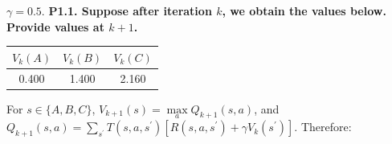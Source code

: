 \documentclass{homework}
\begin{document}
$\gamma = 0.5$.
\clearpage
\textbf{\large P1.1. Suppose after iteration $k$, we obtain the values below. Provide values at $k+1$.}

\begin{table}[h!]
    \centering
    \begin{tabular}{c|c|c}
        \toprule
        $V_k(A)$ & $V_k(B)$ & $V_k(C)$ \\
        \midrule
        0.400 & 1.400 & 2.160 \\
        \bottomrule
    \end{tabular}
    \label{tab:q1avk}
\end{table}
For $s \in \{ A, B, C \}$, $V_{k+1}(s) = \max\limits_{a} Q_{k+1}(s, a)$, and $Q_{k+1}(s, a) = \sum\limits_{s^{\prime}}{ T(s, a, s^{\prime})[ R(s, a, s^{\prime}) + \gamma V_{k}(s^{\prime}) ] }$. Therefore:
\end{document}
